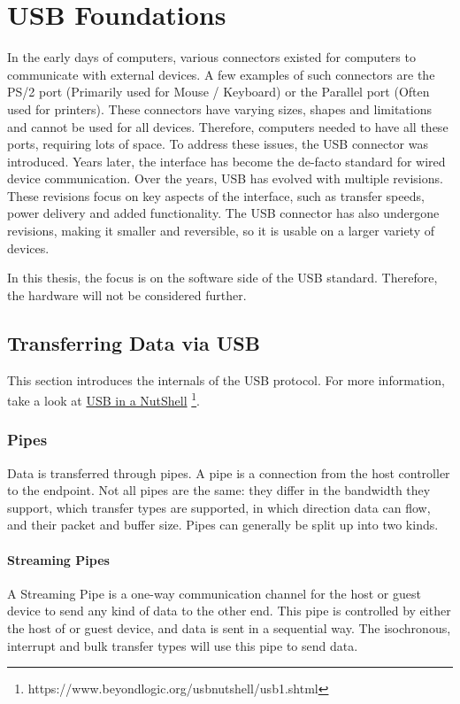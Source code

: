 \chapter{USB Foundations}
\label{chap:rel_work}
In the early days of computers, various connectors existed for computers to communicate with external devices. A few examples of such connectors are the PS/2 port (Primarily used for Mouse / Keyboard) or the Parallel port (Often used for printers). These connectors have varying sizes, shapes and limitations and cannot be used for all devices. Therefore, computers needed to have all these ports, requiring lots of space. To address these issues, the USB connector was introduced. Years later, the interface has become the de-facto standard for wired device communication. Over the years, USB has evolved with multiple revisions. These revisions focus on key aspects of the interface, such as transfer speeds, power delivery and added functionality. The USB connector has also undergone revisions, making it smaller and reversible, so it is usable on a larger variety of devices.

In this thesis, the focus is on the software side of the USB standard. Therefore, the hardware will not be considered further.

\section{Transferring Data via USB}

This section introduces the internals of the USB protocol. For more information, take a look at \href{https://www.beyondlogic.org/usbnutshell/usb1.shtml}{USB in a NutShell} \footnote{https://www.beyondlogic.org/usbnutshell/usb1.shtml}.
\subsection{Pipes}
Data is transferred through pipes. A pipe is a connection from the host controller to the endpoint. Not all pipes are the same: they differ in the bandwidth they support, which transfer types are supported, in which direction data can flow, and their packet and buffer size. Pipes can generally be split up into two kinds.

\subsubsection{Streaming Pipes}
A Streaming Pipe is a one-way communication channel for the host or guest device to send any kind of data to the other end. This pipe is controlled by either the host of or guest device, and data is sent in a sequential way. The isochronous, interrupt and bulk transfer types will use this pipe to send data.

